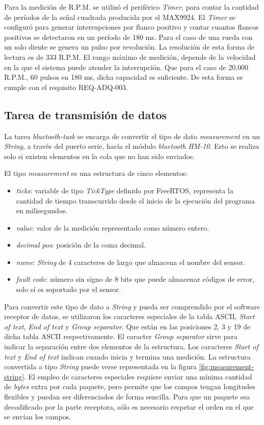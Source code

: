 Para la medición de R.P.M. se utilizó el periférico \textit{Timer}, para contar la cantidad de períodos de la señal cuadrada producida por el MAX9924. El \textit{Timer} se configuró para generar interrupciones por flanco positivo y contar cuantos flancos positivos se detectaron en un período de 180 ms. Para el caso de una rueda con un solo diente se genera un pulso por revolución. La resolución de esta forma de lectura es de 333 R.P.M. El rango máximo de medición, depende de la velocidad en la que el sistema puede atender la interrupción. Que para el caso de 20.000 R.P.M., 60 pulsos en 180 ms, dicha capacidad es suficiente. De esta forma se cumple con el requisito REQ-ADQ-003.

\subsection{Tarea de transmisión de datos}

La tarea \textit{bluetooth-task} se encarga de convertir el tipo de dato \textit{measurement} en un \textit{String}, a través del puerto serie, hacía el módulo \textit{bluetooth} \textit{HM-10}. Esto se realiza solo si existen elementos en la cola que no han sido enviados.

El tipo \textit{measurement} es una estructura de cinco elementos:

\begin{itemize}
\item{\textit{ticks}:} variable de tipo \textit{TickType} definido por FreeRTOS, representa la cantidad de tiempo transcurrido desde el inicio de la ejecución del programa en milisegundos.
\item{\textit{value}:} valor de la medición representado como número entero.
\item{\textit{decimal pos}:} posición de la coma decimal.
\item{\textit{name}:} \textit{String} de 4 caracteres de largo que almacena el nombre del sensor.
\item{\textit{fault code}:} número sin signo de 8 bits que puede almacenar códigos de error, solo sí es soportado por el sensor.
\end{itemize}

Para convertir este tipo de dato a \textit{String} y pueda ser comprendido por el software receptor de datos, se utilizaron los caracteres especiales de la tabla ASCII, \textit{Start of text}, \textit{End of text} y \textit{Group separator}. Que están en las posiciones 2, 3 y 19 de dicha tabla ASCII respectivamente. El caracter \textit{Group separator} sirve para indicar la separación entre dos elementos de la estructura. Los caracteres \textit{Start of text} y \textit{End of text} indican cuando inicia y termina una medición. La estructura convertida a tipo \textit{String} puede verse representada en la figura \ref{fig:measurement-string}. El empleo de caracteres especiales requiere enviar una mínima cantidad de \textit{bytes} extra por cada paquete, pero permite que los campos tengan longitudes flexibles y puedan ser diferenciados de forma sencilla. Para que un paquete sea decodificado por la parte receptora, sólo es necesario respetar el orden en el que se envían los campos.

